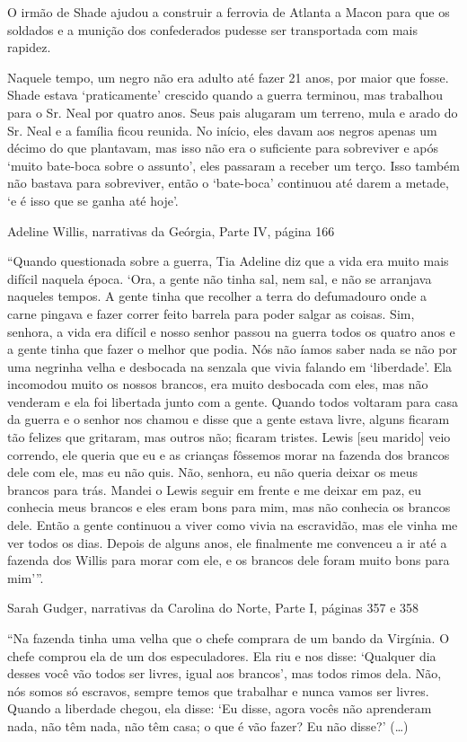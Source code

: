 O irmão de Shade ajudou a construir a ferrovia de Atlanta a Macon para
que os soldados e a munição dos confederados pudesse ser transportada
com mais rapidez.

Naquele tempo, um negro não era adulto até fazer 21 anos, por maior que
fosse. Shade estava `praticamente' crescido quando a guerra terminou,
mas trabalhou para o Sr. Neal por quatro anos. Seus pais alugaram um
terreno, mula e arado do Sr. Neal e a família ficou reunida. No início,
eles davam aos negros apenas um décimo do que plantavam, mas isso não
era o suficiente para sobreviver e após `muito bate-boca sobre o
assunto', eles passaram a receber um terço. Isso também não bastava para
sobreviver, então o `bate-boca' continuou até darem a metade, `e é isso
que se ganha até hoje'.

Adeline Willis, narrativas da Geórgia, Parte IV, página 166

``Quando questionada sobre a guerra, Tia Adeline diz que a vida era
muito mais difícil naquela época. `Ora, a gente não tinha sal, nem sal,
e não se arranjava naqueles tempos. A gente tinha que recolher a terra
do defumadouro onde a carne pingava e fazer correr feito barrela para
poder salgar as coisas. Sim, senhora, a vida era difícil e nosso senhor
passou na guerra todos os quatro anos e a gente tinha que fazer o melhor
que podia. Nós não íamos saber nada se não por uma negrinha velha e
desbocada na senzala que vivia falando em `liberdade'. Ela incomodou
muito os nossos brancos, era muito desbocada com eles, mas não venderam
e ela foi libertada junto com a gente. Quando todos voltaram para casa
da guerra e o senhor nos chamou e disse que a gente estava livre, alguns
ficaram tão felizes que gritaram, mas outros não; ficaram tristes. Lewis
{[}seu marido{]} veio correndo, ele queria que eu e as crianças fôssemos
morar na fazenda dos brancos dele com ele, mas eu não quis. Não,
senhora, eu não queria deixar os meus brancos para trás. Mandei o Lewis
seguir em frente e me deixar em paz, eu conhecia meus brancos e eles
eram bons para mim, mas não conhecia os brancos dele. Então a gente
continuou a viver como vivia na escravidão, mas ele vinha me ver todos
os dias. Depois de alguns anos, ele finalmente me convenceu a ir até a
fazenda dos Willis para morar com ele, e os brancos dele foram muito
bons para mim'''.

Sarah Gudger, narrativas da Carolina do Norte, Parte I, páginas 357 e
358

``Na fazenda tinha uma velha que o chefe comprara de um bando da
Virgínia. O chefe comprou ela de um dos especuladores. Ela riu e nos
disse: `Qualquer dia desses você vão todos ser livres, igual aos
brancos', mas todos rimos dela. Não, nós somos só escravos, sempre temos
que trabalhar e nunca vamos ser livres. Quando a liberdade chegou, ela
disse: `Eu disse, agora vocês não aprenderam nada, não têm nada, não têm
casa; o que é vão fazer? Eu não disse?' (\ldots{})

